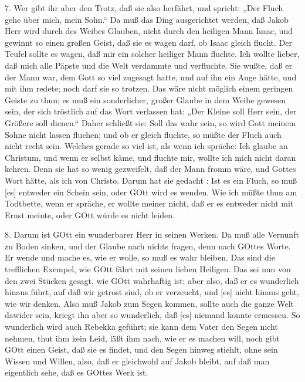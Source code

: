 7. Wer gibt ihr aber den Trotz, daß sie also herfährt, und spricht: „Der Fluch gehe über mich, mein Sohn.“ Da muß das Ding ausgerichtet werden, daß Jakob Herr wird durch des Weibes Glauben, nicht durch den heiligen Mann Isaac, und gewinnt so einen großen Geist, daß sie es wagen darf, ob Isaac gleich flucht. Der Teufel sollte es wagen, daß mir ein solcher heiliger Mann fluchte. Ich wollte lieber, daß mich alle Päpste und die Welt verdammte und verfluchte. Sie wußte, daß er der Mann war, dem Gott so viel zugesagt hatte, und auf ihn ein Auge hätte, und mit ihm redete; noch darf sie so trotzen. Das wäre nicht möglich einem geringen Geiste zu thun; es muß ein sonderlicher, großer Glaube in dem Weibe gewesen sein, der sich tröstlich auf das Wort verlassen hat: „Der Kleine soll Herr sein, der Größere soll dienen.“ Daher schließt sie: Soll das wahr sein, so wird Gott meinem Sohne nicht lassen fluchen; und ob er gleich fluchte, so müßte der Fluch auch nicht recht sein. Welches gerade so viel ist, als wenn ich spräche: Ich glaube an Christum, und wenn er selbst käme, und fluchte mir, wollte ich mich nicht daran kehren. Denn sie hat so wenig gezweifelt, daß der Mann fromm wäre, und Gottes Wort hätte, als ich von Christo. Darum hat sie gedacht
: Ist es ein Fluch, so muß [es] entweder ein Schein sein, oder GOtt wird es wenden. Wie ich müßte thun am Todtbette, wenn er spräche, er wollte meiner nicht, daß er es entweder nicht mit Ernst meinte, oder GOtt würde es nicht leiden.

8. Darum ist GOtt ein wunderbarer Herr in seinen Werken. Da muß alle Vernunft zu Boden sinken, und der Glaube nach nichts fragen, denn nach GOttes Worte. Er wende und mache es, wie er wolle, so muß es wahr bleiben. Das sind die trefflichen Exempel, wie GOtt fährt mit seinen lieben Heiligen. Das sei nun von den zwei Stücken gesagt, wie GOtt wahrhaftig ist; aber also, daß er es wunderlich hinaus führt, auf daß wir getrost sind, ob er verzeucht, und [es] nicht hinaus geht, wie wir denken. Also muß Jakob zum Segen kommen, sollte auch die ganze Welt dawider sein, kriegt ihn aber so wunderlich, daß [es] niemand konnte ermessen. So wunderlich wird auch Rebekka geführt; sie kann dem Vater den Segen nicht nehmen, thut ihm kein Leid, läßt ihm nach, wie er es machen will, noch gibt GOtt einen Geist, daß sie es findet, und den Segen hinweg stiehlt, ohne sein Wissen und Willen, also, daß er gleichwohl auf Jakob bleibt, auf daß man eigentlich sehe, daß es GOttes Werk ist.

